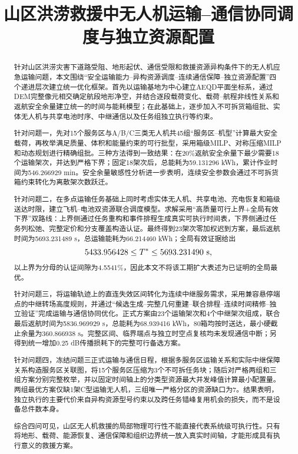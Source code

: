 \documentclass[UTF8,a4paper,12pt]{ctexart}
\title{山区洪涝救援中无人机运输--通信协同调度与独立资源配置}
\author{}
\date{}
\begin{document}
\maketitle


\begin{abstract}
针对山区洪涝灾害下道路受阻、地形起伏、通信受限和救援资源异构条件下的无人机应急运输问题，本文围绕“安全运输能力--异构资源调度--连续通信保障--独立资源配置”四个递进层次建立统一优化框架。首先以运输基地为中心建立AEQD平面坐标系，通过DEM完整像元相交确定航段地形净空，并结合逐段载荷变化、载荷--航程非线性关系和返航安全余量建立统一的时间与能耗模型；在此基础上，逐步加入不可拆货箱组批、实体无人机与共享电池时序、中继通信以及任务组独立执行等约束。

针对问题一，先对15个服务区与A/B/C三类无人机共45组“服务区--机型”计算最大安全载荷，再枚举满足质量、体积和能量约束的可行批型，采用箱级MILP、对称压缩MILP和动态规划进行精确组批。三种方法得到一致结果：在20\%返航安全余量下最少需要18个运输架次，并达到严格下界；固定18架次后，总能耗为59.131296 kWh，累计作业时间为546.266929 min。安全余量敏感性分析进一步表明，连续安全参数会通过不可拆货箱约束转化为离散架次数跃迁。

针对问题二，在多点运输任务基础上同时考虑实体无人机、共享电池、充电恢复和箱级送达时限，建立飞机--电池双资源联合调度模型。求解采用“高质量可行上界+全局有效下界”双路线：上界侧通过任务重构和事件排程生成真实可执行时间表，下界侧通过任务列松弛、完整定价和分支覆盖构造认证。最终得到23架次零加权迟到方案，最后返航时间为5693.231489 s，总运输能耗为66.214460 kWh；全局有效证据给出
\[
5433.956428\le T^*\le5693.231490\ {\rm s},
\]
以上界为分母的认证间隙为4.5541\%，因此本文不将该工期扩大表述为已证明的全局最优。

针对问题三，将运输轨迹上的直连失效区间转化为连续中继服务需求，采用兼容悬停端点的中继转场高度规则，并通过“候选生成--完整几何重建--联合排程--连续时间精修--独立验证”完成运输与通信协同优化。正式方案由23个运输架次和4个中继架次组成，联合最后返航时间为5836.969929 s，总能耗为68.939416 kWh，80箱均按时送达，最小硬截止余量为360.866938 s。完整区间、临界端点与独立时空点复核均未发现通信中断；另得到统一增加0.25 dB传播损耗下的完整可行备选方案。

针对问题四，冻结问题三正式运输与通信日程，根据多服务区运输关系和实际中继保障关系构造服务区关联图，将15个服务区压缩为3个不可拆任务块；随后对严格两组和三组方案分别完整枚举，并以固定时间轴上的分类型资源最大并发峰值计算最小配置量。两组最优方案仅缺1架C型运输无人机，三组唯一严格分区的资源缺口为7。结果表明，独立执行的主要代价来自异构资源型号约束以及跨任务错峰复用机会的损失，而不是设备总件数本身。

综合四问可见，山区无人机救援的局部物理可行性不能直接代表系统级可执行性。只有将地形、载荷、能源恢复、通信保障和组织边界统一放入真实时间轴，才能形成具有执行意义的救援方案。
\end{abstract}
\end{document}
